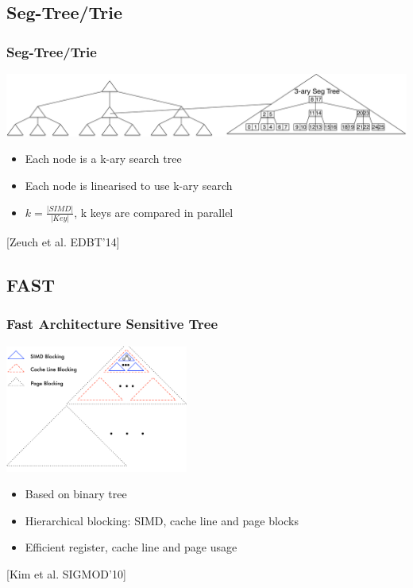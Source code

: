 \documentclass{beamer}
\begin{document}
\subsection{Seg-Tree/Trie}
\begin{frame}
	\frametitle{Seg-Tree/Trie}
	\begin{center}
		\includegraphics[width=1.0\textwidth]{img/SegTree.pdf}
	\end{center}
	\begin{itemize}
		\item Each node is a k-ary search tree
		\item Each node is linearised to use k-ary search
		\item $k = \frac{\vert SIMD \vert }{\vert Key \vert}$, k keys are compared in parallel
	\end{itemize}
	\vspace*{\fill}
	\begin{center}
		\tiny [Zeuch et al. EDBT’14]
	\end{center}
\end{frame}

\subsection{FAST}
\begin{frame}
	\frametitle{Fast Architecture Sensitive Tree}
	\begin{center}
		\includegraphics[width=0.45\textwidth]{img/fast2.png}
	\end{center}
	\begin{itemize}
		\item Based on binary tree
		\item Hierarchical blocking: SIMD, cache line and page blocks
		\item Efficient register, cache line and page usage
	\end{itemize}
	\begin{center}
		\tiny [Kim et al. SIGMOD’10]
	\end{center}
\end{frame}
\end{document}
